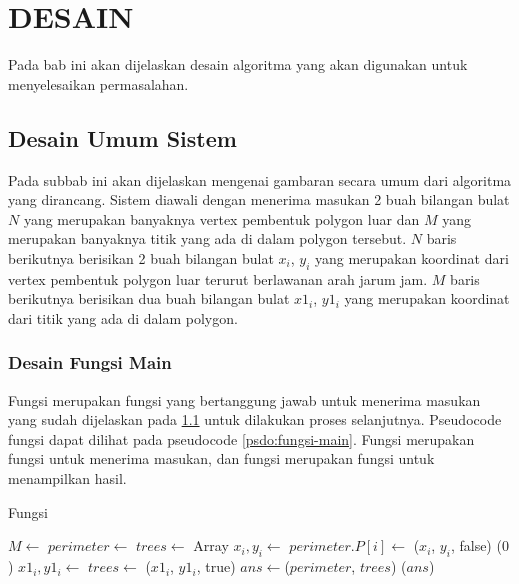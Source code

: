 \chapter{DESAIN}
\label{sec:desain}
Pada bab ini akan dijelaskan desain algoritma yang akan digunakan untuk menyelesaikan permasalahan.

\section{ Desain Umum Sistem}
\label{sec:desain-umum-sistem}
Pada subbab ini akan dijelaskan mengenai gambaran secara umum dari algoritma yang dirancang. Sistem diawali dengan menerima masukan 2 buah bilangan bulat $N$ yang merupakan banyaknya vertex pembentuk polygon luar dan $M$ yang merupakan banyaknya titik yang ada di dalam polygon tersebut. $N$ baris berikutnya berisikan 2 buah bilangan bulat $x_i$, $y_i$ yang merupakan koordinat dari vertex pembentuk polygon luar terurut berlawanan arah jarum jam. $M$ baris berikutnya berisikan dua buah bilangan bulat $x1_i$, $y1_i$ yang merupakan koordinat dari titik yang ada di dalam polygon.

\subsection{ Desain Fungsi Main}
Fungsi  merupakan fungsi yang bertanggung jawab untuk menerima masukan yang sudah dijelaskan pada \ref{sec:desain-umum-sistem} untuk dilakukan proses selanjutnya. Pseudocode fungsi  dapat dilihat pada pseudocode \ref{psdo:fungsi-main}. Fungsi  merupakan fungsi untuk menerima masukan, dan fungsi  merupakan fungsi untuk menampilkan hasil. 

\begin{algorithm}
	\caption{Fungsi }
	\label{psdo:fungsi-main}
    \begin{algorithmic}[1]
            \State $M \leftarrow$ 
            \State $perimeter \leftarrow$ 
            \State $trees \leftarrow$ Array    
                \State $x_i , y_i \leftarrow $ 
                \State $perimeter.P[i]\leftarrow$ ($x_i$, $y_i$, false)
			\EndFor
				\State {}($0$)
				\State {}
			\EndIf
                \State $ x1_i , y1_i \leftarrow $ 
                \State $trees \leftarrow$ ($x1_i$, $y1_i$, true)
            \EndFor
            \State $ans \leftarrow $($perimeter$, $trees$)
            \State {} ($ans $)
        \EndWhile
	\end{algorithmic}
\end{algorithm}
